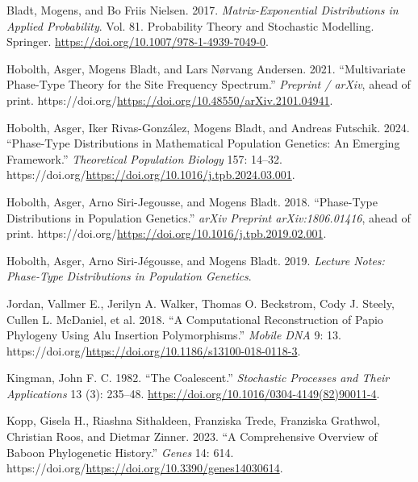 \documentclass[
  10pt,
  a4paper,
]{scrbook}
\newlength{\cslhangindent}
\newenvironment{CSLReferences}[2] %
 {\begin{list}{}{%
  \setlength{\itemindent}{0pt}
  \setlength{\leftmargin}{0pt}
  \setlength{\parsep}{0pt}
  \ifodd #1
   \setlength{\leftmargin}{\cslhangindent}
   \setlength{\itemindent}{-1\cslhangindent}
  \fi
  \setlength{\itemsep}{#2\baselineskip}}}
 {\end{list}}
\let\oldemph\emph
\renewcommand\emph[1]{\oldemph{\color{gray}#1}}
\begin{document}
\protect{}\label{refs}
\begin{CSLReferences}{1}{1}
Bladt, Mogens, and Bo Friis Nielsen. 2017. \emph{Matrix-Exponential
Distributions in Applied Probability}. Vol. 81. Probability Theory and
Stochastic Modelling. Springer.
\url{https://doi.org/10.1007/978-1-4939-7049-0}.

Hobolth, Asger, Mogens Bladt, and Lars Nørvang Andersen. 2021.
{``Multivariate Phase-Type Theory for the Site Frequency Spectrum.''}
\emph{Preprint / arXiv}, ahead of print.
https://doi.org/\url{https://doi.org/10.48550/arXiv.2101.04941}.

Hobolth, Asger, Iker Rivas-González, Mogens Bladt, and Andreas Futschik.
2024. {``Phase-Type Distributions in Mathematical Population Genetics:
An Emerging Framework.''} \emph{Theoretical Population Biology} 157:
14--32. https://doi.org/\url{https://doi.org/10.1016/j.tpb.2024.03.001}.

Hobolth, Asger, Arno Siri-Jegousse, and Mogens Bladt. 2018.
{``Phase-Type Distributions in Population Genetics.''} \emph{arXiv
Preprint arXiv:1806.01416}, ahead of print.
https://doi.org/\url{https://doi.org/10.1016/j.tpb.2019.02.001}.

Hobolth, Asger, Arno Siri-Jégousse, and Mogens Bladt. 2019.
\emph{Lecture Notes: Phase-Type Distributions in Population Genetics}.

{Jordan, Vallmer E., Jerilyn A. Walker, Thomas O. Beckstrom, Cody J.
Steely, Cullen L. McDaniel, et al.} 2018. {``A Computational
Reconstruction of Papio Phylogeny Using Alu Insertion Polymorphisms.''}
\emph{Mobile DNA} 9: 13.
https://doi.org/\url{https://doi.org/10.1186/s13100-018-0118-3}.

Kingman, John F. C. 1982. {``The Coalescent.''} \emph{Stochastic
Processes and Their Applications} 13 (3): 235--48.
\url{https://doi.org/10.1016/0304-4149(82)90011-4}.

Kopp, Gisela H., Riashna Sithaldeen, Franziska Trede, Franziska
Grathwol, Christian Roos, and Dietmar Zinner. 2023. {``A Comprehensive
Overview of Baboon Phylogenetic History.''} \emph{Genes} 14: 614.
https://doi.org/\url{https://doi.org/10.3390/genes14030614}.


\end{CSLReferences}
\end{document}
